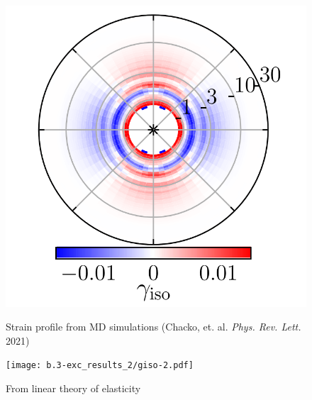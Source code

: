 \begin{frame}[c]
\begin{columns}
\begin{column}{0.4\linewidth}
\begin{figure}
    \centering
    \begin{overprint}
    \centering\includegraphics[width=0.95\linewidth]{b.3-exc_results_2/giso_lit.png}\caption{Strain profile from MD simulations (Chacko, et. al. \textit{Phys. Rev. Lett.} 2021)}
    \centering\texttt{[image: b.3-exc\_results\_2/giso-2.pdf]}\caption{From linear theory of elasticity}
    \end{overprint}
    \label{fig:my_label}
\end{figure}

\end{column}

\end{columns}

\end{frame} 